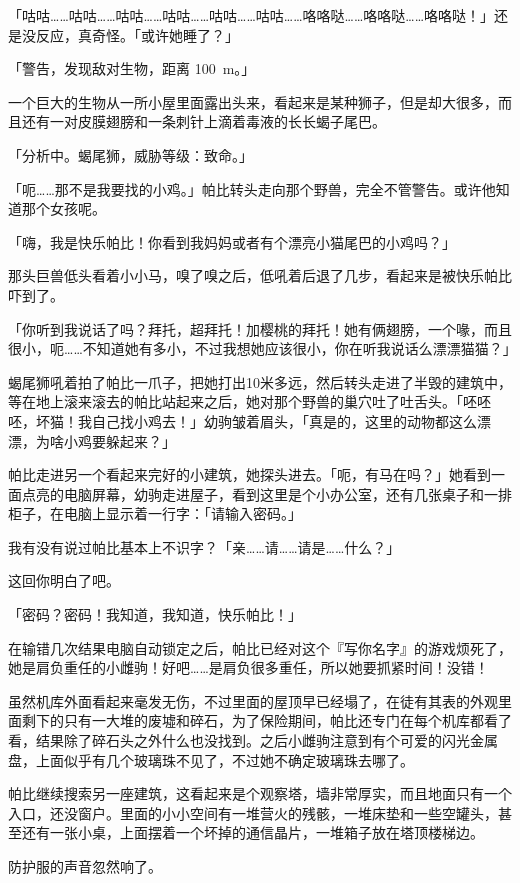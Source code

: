 「咕咕……咕咕……咕咕……咕咕……咕咕……咕咕……咯咯哒……咯咯哒……咯咯哒！」还是没反应，真奇怪。「或许她睡了？」


「{\mt 警告，发现敌对生物，距离 \SI{100}{m}。}」

一个巨大的生物从一所小屋里面露出头来，看起来是某种狮子，但是却大很多，而且还有一对皮膜翅膀和一条刺针上滴着毒液的长长蝎子尾巴。

「{\mt 分析中。蝎尾狮，威胁等级：致命。}」

「呃……那不是我要找的小鸡。」帕比转头走向那个野兽，完全不管警告。或许他知道那个女孩呢。

「嗨，我是快乐帕比！你看到我妈妈或者有个漂亮小猫尾巴的小鸡吗？」

那头巨兽低头看着小小马，嗅了嗅之后，低吼着后退了几步，看起来是被快乐帕比吓到了。

「你听到我说话了吗？拜托，超拜托！加樱桃的拜托！她有俩翅膀，一个喙，而且很小，呃……不知道她有多小，不过我想她应该很小，你在听我说话么漂漂猫猫？」

蝎尾狮吼着拍了帕比一爪子，把她打出10米多远，然后转头走进了半毁的建筑中，等在地上滚来滚去的帕比站起来之后，她对那个野兽的巢穴吐了吐舌头。「呸呸呸，坏猫！我自己找小鸡去！」幼驹皱着眉头，「真是的，这里的动物都这么漂漂，为啥小鸡要躲起来？」

帕比走进另一个看起来完好的小建筑，她探头进去。「呃，有马在吗？」她看到一面点亮的电脑屏幕，幼驹走进屋子，看到这里是个小办公室，还有几张桌子和一排柜子，在电脑上显示着一行字：「{\mt 请输入密码。}」

我有没有说过帕比基本上不识字？「亲……请……请是……什么？」

这回你明白了吧。

「密码？密码！我知道，我知道，快乐帕比！」

在输错几次结果电脑自动锁定之后，帕比已经对这个『写你名字』的游戏烦死了，她是肩负重任的小雌驹！好吧……是肩负很多重任，所以她要抓紧时间！没错！

虽然机库外面看起来毫发无伤，不过里面的屋顶早已经塌了，在徒有其表的外观里面剩下的只有一大堆的废墟和碎石，为了保险期间，帕比还专门在每个机库都看了看，结果除了碎石头之外什么也没找到。之后小雌驹注意到有个可爱的闪光金属盘，上面似乎有几个玻璃珠不见了，不过她不确定玻璃珠去哪了。

帕比继续搜索另一座建筑，这看起来是个观察塔，墙非常厚实，而且地面只有一个入口，还没窗户。里面的小小空间有一堆营火的残骸，一堆床垫和一些空罐头，甚至还有一张小桌，上面摆着一个坏掉的通信晶片，一堆箱子放在塔顶楼梯边。

防护服的声音忽然响了。


